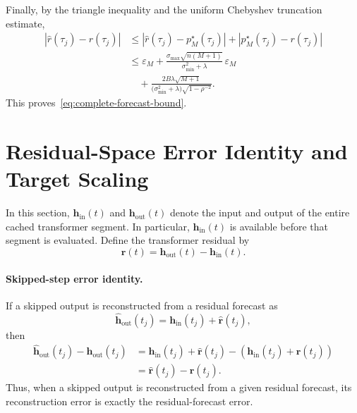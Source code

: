 Finally, by the triangle inequality and the uniform Chebyshev
truncation estimate,
\begin{align}
\left|
\widehat r(\tau_j)-r(\tau_j)
\right|
&\leq
\left|
\widehat r(\tau_j)-p_M^\star(\tau_j)
\right|
+
\left|
p_M^\star(\tau_j)-r(\tau_j)
\right|
\nonumber\\
&\leq
\varepsilon_M
+
\frac{
\sigma_{\max}\sqrt{n(M+1)}
}{
\sigma_{\min}^2+\lambda
}
\,\varepsilon_M
\nonumber\\
&\quad+
\frac{
2B\lambda\sqrt{M+1}
}{
\bigl(\sigma_{\min}^2+\lambda\bigr)
\sqrt{1-\rho^{-2}}
}.
\end{align}
This proves~\eqref{eq:complete-forecast-bound}.

\endgroup

\section{Residual-Space Error Identity and Target Scaling}
\label{app:residual}

In this section,
$\mathbf{h}_{\mathrm{in}}(t)$ and
$\mathbf{h}_{\mathrm{out}}(t)$ denote the input and output of the entire
cached transformer segment. In particular,
$\mathbf{h}_{\mathrm{in}}(t)$ is available before that segment is
evaluated. Define the transformer residual by
\begin{equation}
\mathbf{r}(t)
=
\mathbf{h}_{\mathrm{out}}(t)
-
\mathbf{h}_{\mathrm{in}}(t).
\label{eq:residual-definition}
\end{equation}

\paragraph{Skipped-step error identity.}
If a skipped output is reconstructed from a residual forecast as
\begin{equation}
\widehat{\mathbf{h}}_{\mathrm{out}}(t_j)
=
\mathbf{h}_{\mathrm{in}}(t_j)
+
\widehat{\mathbf{r}}(t_j),
\label{eq:residual-reconstruction}
\end{equation}
then
\begin{align}
\widehat{\mathbf{h}}_{\mathrm{out}}(t_j)
-
\mathbf{h}_{\mathrm{out}}(t_j)
&=
\mathbf{h}_{\mathrm{in}}(t_j)
+
\widehat{\mathbf{r}}(t_j)
-
\left(
\mathbf{h}_{\mathrm{in}}(t_j)
+
\mathbf{r}(t_j)
\right)
\nonumber\\
&=
\widehat{\mathbf{r}}(t_j)
-
\mathbf{r}(t_j).
\label{eq:residual-error-identity}
\end{align}
Thus, when a skipped output is reconstructed from a given residual
forecast, its reconstruction error is exactly the residual-forecast
error.

